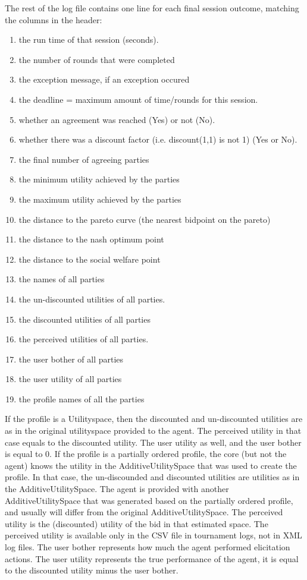 \documentclass[]{article}
\begin{document}
The rest of the log file contains one line for each final session outcome, matching the columns in the header:

\begin{enumerate}
\item the run time of that session (seconds). 
\item the number of rounds that were completed
\item the exception message, if an exception occured
\item the deadline = maximum amount of time/rounds for this session.
\item whether an agreement was reached (Yes) or not (No).
\item whether there was a discount factor (i.e. discount(1,1) is not 1) (Yes or No).
\item the final number of agreeing parties 
\item the minimum utility achieved by the parties
\item the maximum utility achieved by the parties
\item the distance to the pareto curve (the nearest bidpoint on the pareto)
\item the distance to the nash optimum point
\item the distance to the social welfare point
\item the names of all parties
\item the un-discounted utilities of all parties.
\item the discounted utilities of all parties
\item the perceived utilities of all parties. 
\item the user bother of all parties
\item the user utility of all parties
\item the profile names of all the parties
\end{enumerate}

If the profile is a Utilityspace, then the discounted and un-discounted utilities are as in the original utilityspace provided to the agent. The perceived utility in that case equals to the discounted utility. The user utility as well, and the user bother is equal to 0.
If the profile is a partially ordered profile, the core (but not the agent) knows the utility in the AdditiveUtilitySpace that was used to create the profile. In that case, the un-discounded and discounted utilities are utilities as in the AdditiveUtilitySpace. The agent is provided with another AdditiveUtilitySpace that was generated based on the partially ordered profile, and usually will differ from the original AdditiveUtilitySpace. The perceived utility is the (discounted) utility of the bid in that estimated space. 
The perceived utility is available only in the CSV file in tournament logs, not in XML log files. The user bother represents how much the agent performed elicitation actions. The user utility represents the true performance of the agent, it is equal to the discounted utility minus the user bother.
\end{document}
